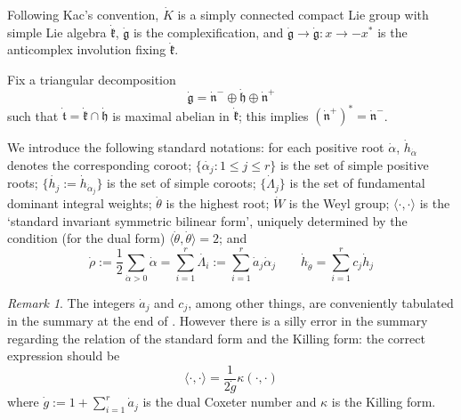 \documentclass{amsart}
\theoremstyle{conjecture}
\theoremstyle{definition}
\theoremstyle{question}
\theoremstyle{questions}
\theoremstyle{remark}
\newtheorem*{remark}{Remark}
\theoremstyle{remarks}
\theoremstyle{example}
\numberwithin{equation}{section}
\begin{document}
Following Kac's convention, $\dot K$ is a simply connected compact Lie group with simple
Lie algebra $\dot{\mathfrak k}$, $\dot{\mathfrak g}$ is the complexification,
 and $\dot{\mathfrak g} \to \dot{\mathfrak g}:x
\to -x^*$ is the anticomplex involution fixing $\dot{\mathfrak
k}$.

Fix a triangular decomposition
\begin{equation}\label{6.1}\dot {\mathfrak g}=\dot {\mathfrak n}^{-}\oplus\dot
{\mathfrak h}\oplus\dot {\mathfrak n}^{ +}\end{equation} such that
$\dot{\mathfrak t}=\dot{\mathfrak k} \cap \dot{\mathfrak h}$ is
maximal abelian in $\dot{\mathfrak k}$; this implies
$(\dot{\mathfrak n}^+)^*=\dot{\mathfrak n}^-$.

We introduce the
following standard notations: for each positive root $\dot \alpha$, $\dot h_{\dot\alpha}$
denotes the corresponding coroot; $\{\dot{\alpha_j}: 1\le j\le r\}$ is
the set of simple positive roots; $\{\dot{h_j}:=\dot h_{\dot\alpha_j}\}$ is the set of
simple coroots; $\{\dot{\Lambda}_j\}$ is the set of fundamental
dominant integral weights; $\dot{\theta}$ is the highest root;  $\dot W$ is
the Weyl group; $\langle\cdot ,\cdot\rangle$ is the `standard
invariant symmetric bilinear form', uniquely determined by the condition (for the dual form)
$\langle\dot{\theta} ,\dot{\theta}\rangle = 2$; and
\begin{equation}\label{dotdfn}
\dot{\rho}:=\frac 12\sum_{\dot\alpha>0}\dot{\alpha}=\sum_{i=1}^r\dot{\Lambda_i}:=\sum_{i=1}^r \dot a_j\dot \alpha_j
\qquad \dot h_{\dot\theta}=\sum_{i=1}^r c_j\dot h_j\end{equation}

\begin{remark} The integers $\dot a_j$ and $c_j$, among other things, are conveniently tabulated in the summary at the end of
\cite{Carter}. However there is a silly error in the summary regarding the relation of the standard form and the Killing form: the correct expression should be
$$\langle\cdot ,\cdot\rangle=\frac{1}{2\dot g}\kappa(\cdot,\cdot)$$
where $\dot g:=1+\sum_{i=1}^r\dot a_j$ is the dual Coxeter number and $\kappa$ is the Killing form.
\end{remark}
\end{document}
